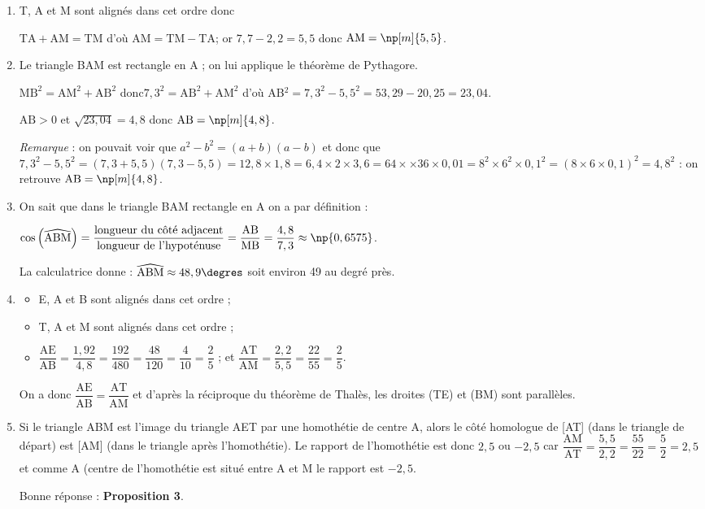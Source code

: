 \documentclass[12pt,a4paper,french]{article}
\begin{document}
\begin{enumerate}
\item T, A et M sont alignés dans cet ordre donc

$\mathrm{TA} + \mathrm{AM} = \mathrm{TM}$ d'où $\mathrm{AM} = \mathrm{TM} - \mathrm{TA}$; or $7,7 - 2,2 = 5,5$ donc $\mathrm{AM} =  \np[m]{5,5}$.

\item Le triangle BAM est rectangle en A ; on lui applique le théorème de Pythagore.

$\mathrm{MB}^2 = \mathrm{AM}^2+\mathrm{AB}^2$ \quad donc\quad  $7,3^2  = \mathrm{AB}^2 + \mathrm{AM}^2 $ d'où AB$^2 = 7,3^2 - 5,5^2 = 53,29 - 20,25  = 23,04$.

$\mathrm{AB}>0$ \quad et \quad $\sqrt{23,04}=4,8$ \quad donc \quad  $\mathrm{AB} = \np[m]{4,8}$.

\emph{Remarque} : on pouvait voir que $a^2 - b^2 = (a + b)(a - b)$ et donc que
$7,3^2 - 5,5^2 = (7,3 + 5,5)(7,3 - 5,5) = 12,8 \times 1,8 = 6,4 \times 2 \times 3,6 = 64 \times \times 36 \times 0,01 = 8^2 \times 6^2 \times 0,1^2= (8 \times 6 \times 0,1)^2 = 4,8^2$ : on retrouve $\mathrm{AB} = \np[m]{4,8}$.

\item On sait que  dans le triangle BAM  rectangle en A on a par définition :

$\cos\left(\widehat{\text{ABM}}\right) = \dfrac{\text{longueur du côté adjacent}}{\text{longueur de l'hypoténuse}} = \dfrac{\text{AB}}{\text{MB}} = \dfrac{4,8}{7,3}  \approx \np{0,6575}$.

La calculatrice donne : $\widehat{\text{ABM}}\approx 48,9\degres$ soit environ 49\degres{} au degré près.

	\item \begin{itemize}
		\item E, A et B sont alignés dans cet ordre ;
		\item T, A et M sont alignés dans cet ordre ;
		\item $\dfrac{\mathrm{AE}}{\mathrm{AB}} = \dfrac{1,92}{4,8} = \dfrac{192}{480} = \dfrac{48}{120} = \dfrac{4}{10} = \dfrac25$ ; et $\dfrac{\mathrm{AT}}{\mathrm{AM}} = \dfrac{2,2}{5,5} = \dfrac{22}{55} = \dfrac25$.
	\end{itemize}

On a donc $\dfrac{\mathrm{AE}}{\mathrm{AB}} = \dfrac{\mathrm{AT}}{\mathrm{AM}}$ et d'après
 la réciproque du théorème de Thalès, les droites (TE) et (BM) sont parallèles.
	\item Si le triangle ABM est l'image du triangle AET par une homothétie de centre A, alors le côté homologue de [AT] (dans le triangle de départ) est [AM] (dans le triangle après l'homothétie). Le rapport de l'homothétie est donc $2,5$ ou $- 2,5$ car $\dfrac{\text{AM}}{\text{AT}} = \dfrac{5,5}{2,2} = \dfrac{55}{22} = \dfrac52 = 2,5$ et comme A (centre de l'homothétie est situé entre A et M le rapport est $- 2,5$.

Bonne réponse : \textbf{Proposition 3}.
\end{enumerate}
\end{document}
